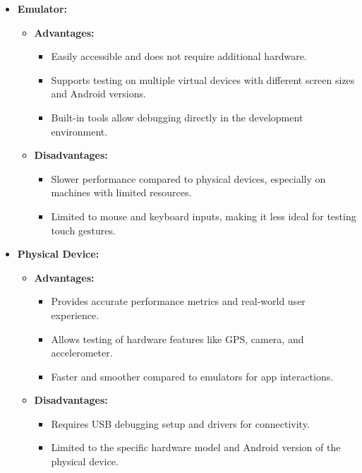 \documentclass{article}
\begin{document}
\begin{itemize}
    \item \textbf{Emulator:}
    \begin{itemize}
        \item \textbf{Advantages:}
        \begin{itemize}
            \item Easily accessible and does not require additional hardware.
            \item Supports testing on multiple virtual devices with different screen sizes and Android versions.
            \item Built-in tools allow debugging directly in the development environment.
        \end{itemize}
        \item \textbf{Disadvantages:}
        \begin{itemize}
            \item Slower performance compared to physical devices, especially on machines with limited resources.
            \item Limited to mouse and keyboard inputs, making it less ideal for testing touch gestures.
        \end{itemize}
    \end{itemize}
    \item \textbf{Physical Device:}
    \begin{itemize}
        \item \textbf{Advantages:}
        \begin{itemize}
            \item Provides accurate performance metrics and real-world user experience.
            \item Allows testing of hardware features like GPS, camera, and accelerometer.
            \item Faster and smoother compared to emulators for app interactions.
        \end{itemize}
        \item \textbf{Disadvantages:}
        \begin{itemize}
            \item Requires USB debugging setup and drivers for connectivity.
            \item Limited to the specific hardware model and Android version of the physical device.
        \end{itemize}
    \end{itemize}
\end{itemize}
\end{document}
